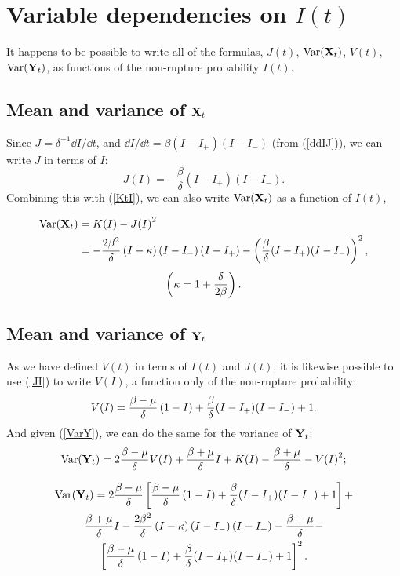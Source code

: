 \section{Variable dependencies on $I(t)$}

It happens to be possible to write all of the formulas, $J(t)$, $\text{Var}({{\bf X}_t})$, $V(t)$, $\text{Var}({{\bf Y}_t})$, as functions of the non-rupture probability $I(t)$. 


\subsection{Mean and variance of ${{\bf X}_t}$}

Since $J = \delta^{-1}{\dd I}/{\dd t} $, and ${\dd I}/{\dd t} =  \beta (I - I_+)(I-I_-)$ (from (\ref{ddIJ})), we can write $J$ in terms of $I$:
\begin{equation}
\label{JI}
J(I) = -\frac{\beta}{\delta}  (I - I_+)(I-I_-).
\end{equation}
Combining this with (\ref{KtI}), we can also write $\text{Var}({{\bf X}_t})$ as a function of $I(t)$,

\begin{align*}
\text{Var}({{\bf X}_t}) &= K(I) - {J(I)}^2\\
&=-\frac{2\beta^2}{\delta}\left( I-\kappa\right)\left( I-I_-\right)\left( I-I_+\right) - \left(\frac{\beta}{\delta}  (I - I_+)(I-I_-)\right)^2,
\end{align*}
$$\left(\kappa = 1+\frac{\delta}{2\beta}\right).$$



\subsection{Mean and variance of ${{\bf Y}_t}$}

As we have defined $V(t)$ in terms of $I(t)$ and $J(t)$, it is likewise possible to use (\ref{JI}) to write $V(I)$, a function only of the non-rupture probability:
$$V(I) = \frac{\beta - \mu}{\delta}\left(1-I\right) + \frac{\beta}{\delta} (I - I_+)(I-I_-) + 1.$$
And given (\ref{VarY}), we can do the same for the variance of ${{\bf Y}_t}$:
$$\text{Var}({{\bf Y}_t}) = 2\frac{\beta-\mu}{\delta} V(I) + \frac{\beta+\mu}{\delta}I + K(I) - \frac{\beta+\mu}{\delta} - {V(I)}^2;$$


\begin{multline*}
\text{Var}({{\bf Y}_t}) = 2\frac{\beta - \mu}{\delta} \left[ \frac{\beta - \mu}{\delta}\left(1-I\right) + \frac{\beta}{\delta} (I - I_+)(I-I_-) + 1\right] + \\
\frac{\beta+\mu}{\delta} I -\frac{2\beta^2}{\delta}\left( I-\kappa\right)\left( I-I_-\right)\left( I-I_+\right) - \frac{\beta + \mu}{\delta} - \\ \left[\frac{\beta - \mu}{\delta}\left(1-I\right) + \frac{\beta}{\delta} (I - I_+)(I-I_-) + 1\right]^2.
\end{multline*}
